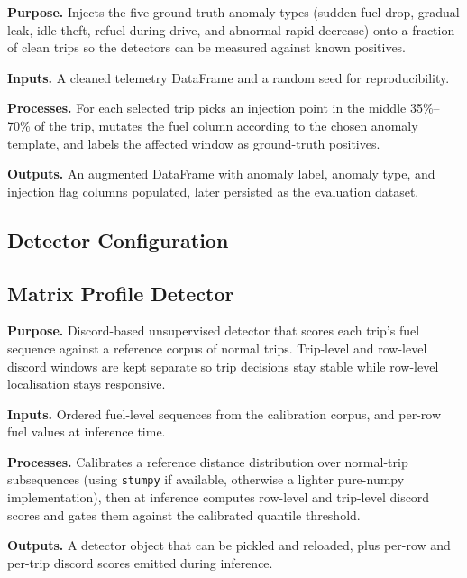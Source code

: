 \noindent\textbf{Purpose.} Injects the five ground-truth anomaly types (sudden fuel drop, gradual leak, idle theft, refuel during drive, and abnormal rapid decrease) onto a fraction of clean trips so the detectors can be measured against known positives.

\noindent\textbf{Inputs.} A cleaned telemetry DataFrame and a random seed for reproducibility.

\noindent\textbf{Processes.} For each selected trip picks an injection point in the middle 35\%--70\% of the trip, mutates the fuel column according to the chosen anomaly template, and labels the affected window as ground-truth positives.

\noindent\textbf{Outputs.} An augmented DataFrame with anomaly label, anomaly type, and injection flag columns populated, later persisted as the evaluation dataset.



\subsection*{Detector Configuration}

\subsection{Matrix Profile Detector}
\label{sec:code_matrix_profile}

\noindent\textbf{Purpose.} Discord-based unsupervised detector that scores each trip's fuel sequence against a reference corpus of normal trips. Trip-level and row-level discord windows are kept separate so trip decisions stay stable while row-level localisation stays responsive.

\noindent\textbf{Inputs.} Ordered fuel-level sequences from the calibration corpus, and per-row fuel values at inference time.

\noindent\textbf{Processes.} Calibrates a reference distance distribution over normal-trip subsequences (using \texttt{stumpy} if available, otherwise a lighter pure-numpy implementation), then at inference computes row-level and trip-level discord scores and gates them against the calibrated quantile threshold.

\noindent\textbf{Outputs.} A detector object that can be pickled and reloaded, plus per-row and per-trip discord scores emitted during inference.

